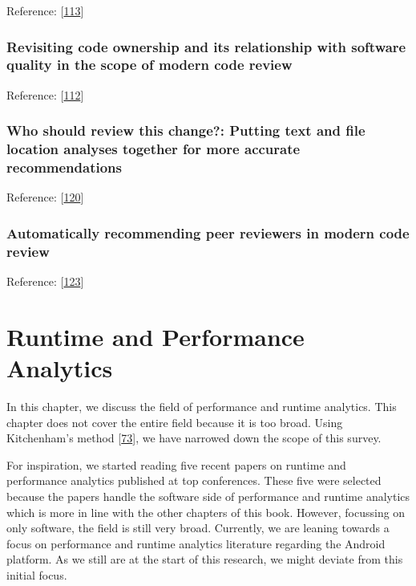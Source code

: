 \documentclass[]{book}
\begin{document}
Reference: {[}\protect\hyperlink{ref-thongtanunam2015should}{113}{]}

\subsection{Revisiting code ownership and its relationship with software
quality in the scope of modern code
review}\label{revisiting-code-ownership-and-its-relationship-with-software-quality-in-the-scope-of-modern-code-review}

Reference: {[}\protect\hyperlink{ref-thongtanunam2016revisiting}{112}{]}

\subsection{Who should review this change?: Putting text and file
location analyses together for more accurate
recommendations}\label{who-should-review-this-change-putting-text-and-file-location-analyses-together-for-more-accurate-recommendations}

Reference: {[}\protect\hyperlink{ref-xia2015should}{120}{]}

\subsection{Automatically recommending peer reviewers in modern code
review}\label{automatically-recommending-peer-reviewers-in-modern-code-review}

Reference: {[}\protect\hyperlink{ref-zanjani2016automatically}{123}{]}

\chapter{Runtime and Performance
Analytics}\label{runtime-and-performance-analytics}

In this chapter, we discuss the field of performance and runtime
analytics. This chapter does not cover the entire field because it is
too broad. Using Kitchenham's method
{[}\protect\hyperlink{ref-kitchenham2004procedures}{73}{]}, we have
narrowed down the scope of this survey.

For inspiration, we started reading five recent papers on runtime and
performance analytics published at top conferences. These five were
selected because the papers handle the software side of performance and
runtime analytics which is more in line with the other chapters of this
book. However, focussing on only software, the field is still very
broad. Currently, we are leaning towards a focus on performance and
runtime analytics literature regarding the Android platform. As we still
are at the start of this research, we might deviate from this initial
focus.
\end{document}
